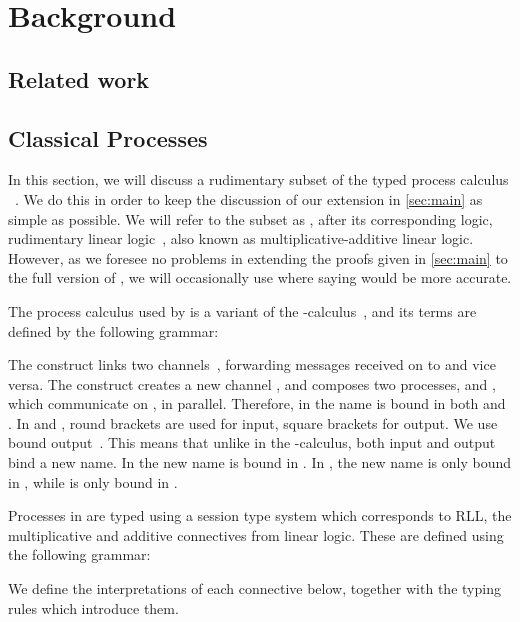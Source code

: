 \chapter{Background}\label{sec:background}
\section{Related work}
\section{Classical Processes}
In this section, we will discuss a rudimentary subset of the typed process calculus \cp~\cite{wadler2012}.
We do this in order to keep the discussion of our extension in \cref{sec:main} as simple as possible.
We will refer to the subset as \rcp, after its corresponding logic, rudimentary linear logic~\cite[RLL]{girard1992}, also known as multiplicative-additive linear logic.
However, as we foresee no problems in extending the proofs given in \cref{sec:main} to the full version of \cp, we will occasionally use \cp where saying \rcp would be more accurate. 

The process calculus used by \rcp is a variant of the \textpi-calculus~\cite{milner1992b}, and its terms are defined by the following grammar:

The construct  links two channels~\cite{sangiorgi1996,boreale1998}, forwarding messages received on  to  and vice versa.
The construct  creates a new channel , and composes two processes,  and , which communicate on , in parallel. Therefore, in  the name  is bound in both  and . 
In  and , round brackets are used for input, square brackets for output.
We use bound output~\cite{sangiorgi1996}.
This means that unlike in the \textpi-calculus, both input and output bind a new name. 
In  the new name  is bound in .
In , the new name  is only bound in , while  is only bound in .

Processes in \rcp are typed using a session type system which corresponds to
RLL, the multiplicative and additive connectives from linear logic.
These are defined using the following grammar:

We define the interpretations of each connective below, together with the typing
rules which introduce them.

